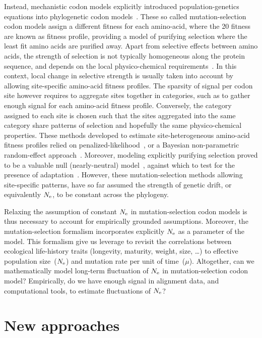 Instead, mechanistic \gls{codon} models explicitly introduced population-genetics equations into phylogenetic \gls{codon} models~\citep{Halpern1998}.
These so called mutation-selection \gls{codon} models assign a different fitness for each amino-acid, where the 20 fitness are known as fitness profile, providing a model of purifying selection where the least fit amino acids are purified away.
Apart from selective effects between amino acids, the strength of selection is not typically homogeneous along the protein sequence, and depends on the local physico-chemical requirements~\citep{Echave2016, Goldstein2016,Goldstein2017}.
In this context, local change in selective strength is usually taken into account by allowing site-specific amino-acid fitness profiles.
The sparsity of signal per codon site however requires to aggregate sites together in categories, such as to gather enough signal for each amino-acid fitness profile.
Conversely, the category assigned to each site is chosen such that the sites aggregated into the same category share patterns of selection and hopefully the same physico-chemical properties.
These methods developed to estimate site-heterogeneous amino-acid fitness profiles relied on penalized-likelihood~\citep{Tamuri2012,Tamuri2014}, or a Bayesian non-parametric random-effect approach~\citep{Rodrigue2010,Rodrigue2014,Rodrigue2016}.
Moreover, modeling explicitly purifying selection proved to be a valuable null (\gls{nearly-neutral}) model~\citep{Spielman2015, DosReis2015}, against which to test for the presence of adaptation~\citep{Rodrigue2016,Bloom2017}.
However, these mutation-selection methods allowing site-specific patterns, have so far assumed the strength of genetic drift, or equivalently $N_{\mathrm{e}}$, to be constant across the phylogeny.

Relaxing the assumption of constant $N_{\mathrm{e}}$ in mutation-selection \gls{codon} models is thus necessary to account for empirically grounded assumptions.
Moreover, the mutation-selection formalism incorporates explicitly $N_{\mathrm{e}}$ as a parameter of the model.
This formalism give us leverage to revisit the correlations between ecological life-history traits (longevity, maturity, weight, size, \ldots) to effective population size~($N_{\mathrm{e}}$) and mutation rate per unit of time~($\mu$).
Altogether, can we mathematically model long-term fluctuation of $N_{\mathrm{e}}$ in mutation-selection codon model?
Empirically, do we have enough signal in alignment data, and computational tools, to estimate fluctuations of $N_{\mathrm{e}}$?


\section{New approaches}
\label{sec:NewApproaches}

